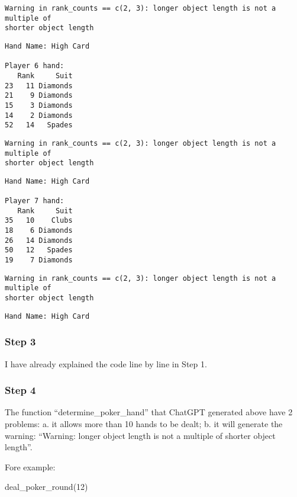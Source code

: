 \documentclass[
  letterpaper,
  DIV=11,
  numbers=noendperiod]{scrartcl}
\newenvironment{Shaded}{\begin{snugshade}}{\end{snugshade}}
\newcommand{\DecValTok}[1]{\textcolor[rgb]{0.68,0.00,0.00}{#1}}
\newcommand{\FunctionTok}[1]{\textcolor[rgb]{0.28,0.35,0.67}{#1}}
\newcommand{\NormalTok}[1]{\textcolor[rgb]{0.00,0.23,0.31}{#1}}
\begin{document}
\begin{verbatim}
Warning in rank_counts == c(2, 3): longer object length is not a multiple of
shorter object length
\end{verbatim}

\begin{verbatim}
Hand Name: High Card 

Player 6 hand: 
   Rank     Suit
23   11 Diamonds
21    9 Diamonds
15    3 Diamonds
14    2 Diamonds
52   14   Spades
\end{verbatim}

\begin{verbatim}
Warning in rank_counts == c(2, 3): longer object length is not a multiple of
shorter object length
\end{verbatim}

\begin{verbatim}
Hand Name: High Card 

Player 7 hand: 
   Rank     Suit
35   10    Clubs
18    6 Diamonds
26   14 Diamonds
50   12   Spades
19    7 Diamonds
\end{verbatim}

\begin{verbatim}
Warning in rank_counts == c(2, 3): longer object length is not a multiple of
shorter object length
\end{verbatim}

\begin{verbatim}
Hand Name: High Card 
\end{verbatim}

\hypertarget{step-3-2}{%
\subsubsection{Step 3}\label{step-3-2}}

I have already explained the code line by line in Step 1.

\hypertarget{step-4-1}{%
\subsubsection{Step 4}\label{step-4-1}}

The function ``determine\_poker\_hand'' that ChatGPT generated above
have 2 problems: a. it allows more than 10 hands to be dealt; b. it will
generate the warning: ``Warning: longer object length is not a multiple
of shorter object length''.

Fore example:

\begin{Shaded}
\begin{Highlighting}[]
\FunctionTok{deal\_poker\_round}\NormalTok{(}\DecValTok{12}\NormalTok{)}
\end{Highlighting}
\end{Shaded}
\end{document}
